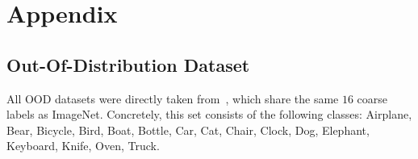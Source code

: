 \documentclass[10pt,letterpaper]{article}
\begin{document}



\appendix
\renewcommand{\thefigure}{A\arabic{figure}}
\renewcommand{\thetable}{A\arabic{table}}
\setcounter{figure}{0}  
\setcounter{table}{0}
\newpage
\section{Appendix}

\subsection{Out-Of-Distribution Dataset}
\label{sec: ood-dataset-details}
All OOD datasets were directly taken from~\citep{geirhos2018imagenet}, which share the same $16$ coarse labels as ImageNet. Concretely, this set consists of the following classes: Airplane, Bear, Bicycle, Bird, Boat, Bottle, Car, Cat, Chair, Clock, Dog, Elephant, Keyboard, Knife, Oven, Truck.\\
\end{document}
